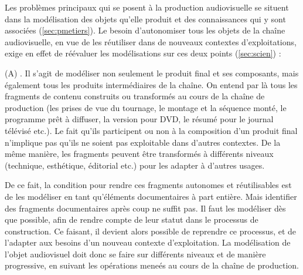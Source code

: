 Les problèmes principaux qui se posent à la production audiovisuelle se situent dans la modélisation des objets qu'elle produit et des connaissances qui y sont associées (\ref{sec:pmetiers}). 
Le besoin d'autonomiser tous les objets de la chaîne audiovisuelle, en vue de les réutiliser dans de nouveaux contextes d'exploitations, exige en effet de réévaluer les modélisations sur ces deux points (\ref{sec:scien}) : 
\begin{liste}
	\item[(A)] .
	Il s'agit de modéliser non seulement le produit final et ses composants, mais également tous les produits intermédiaires de la chaîne.
	On entend par là tous les fragments de contenu construits ou transformés au cours de la chaîne de production (les prises de vue du tournage, le montage et la séquence monté, le programme prêt à diffuser, la version pour DVD, le résumé pour le journal télévisé etc.).
	Le fait qu'ils participent ou non à la composition d'un produit final n'implique pas qu'ils ne soient pas exploitable dans d'autres contextes.
	De la même manière, les fragments peuvent être transformés à différents niveaux (technique, esthétique, éditorial etc.) pour les adapter à d'autres usages. 

	De ce fait, la condition pour rendre ces fragments autonomes et réutilisables est de les modéliser en tant qu'éléments documentaires à part entière.	
	Mais identifier des fragments documentaires après coup ne suffit pas. 
	Il faut les modéliser dès que possible, afin de rendre compte de leur statut dans le processus de construction. 
	Ce faisant, il devient alors possible de reprendre ce processus, et de l'adapter aux besoins d'un nouveau contexte d'exploitation. 
	La modélisation de l'objet audiovisuel doit donc se faire sur différents niveaux et de manière progressive, en suivant les opérations meneés au cours de la chaîne de production.\\



\end{liste}
